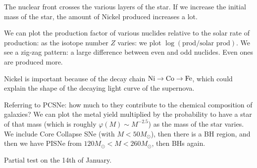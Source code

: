 \documentclass[main.tex]{subfiles}
\begin{document}
The nuclear front crosses the various layers of the star. 
If we increase the initial mass of the star, the amount of Nickel produced increases a lot. 

We can plot the production factor of various nuclides relative to the solar rate of production: as the isotope number \(Z\) varies: we plot \(\log (\text{prod} / \text{solar prod})\). We see a zig-zag pattern: a large difference between even and odd nuclides. Even ones are produced more. 

Nickel is important because of the decay chain \(\ce{Ni} \rightarrow \ce{Co} \rightarrow \ce{Fe}\), which could explain the shape of the decaying light curve of the supernova. 

Referring to PCSNe: how much to they contribute to the chemical composition of galaxies? 
We can plot the metal yield multiplied by the probability to have a star of that mass (which is roughly \(\varphi (M) \sim M^{-2.5}\)) as the mass of the star varies. We include Core Collapse SNe (with \(M < 50 M_{\odot}\)), then there is a BH region, and then we have PISNe from \(120 M_{\odot}< M < 260 M_{\odot}\), then BHs again. 

Partial test on the 14th of January.
\end{document}
